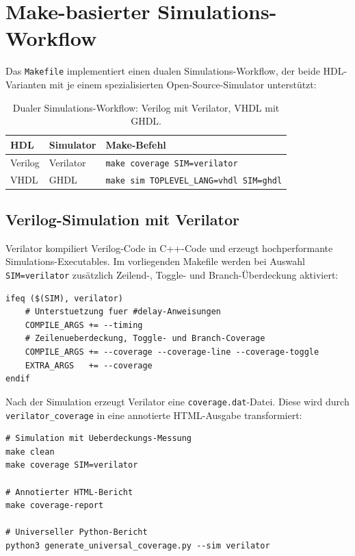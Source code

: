 ﻿\documentclass[12pt,a4paper]{report}
\begin{document}
\section{Make-basierter Simulations-Workflow}
\label{subsec:make_workflow}

Das \texttt{Makefile} implementiert einen dualen Simulations-Workflow, der beide
HDL-Varianten mit je einem spezialisierten Open-Source-Simulator unterstützt:

\begin{table}[H]
\centering
\begin{tabular}{|l|l|l|}
\hline
\textbf{HDL} & \textbf{Simulator} & \textbf{Make-Befehl} \\
\hline
Verilog & Verilator & \texttt{make coverage SIM=verilator} \\
VHDL    & GHDL      & \texttt{make sim TOPLEVEL\_LANG=vhdl SIM=ghdl} \\
\hline
\end{tabular}
\caption{Dualer Simulations-Workflow: Verilog mit Verilator, VHDL mit GHDL.}
\label{tab:sim_workflow}
\end{table}

\subsection{Verilog-Simulation mit Verilator}

Verilator kompiliert Verilog-Code in C++-Code und erzeugt hochperformante
Simulations-Executables. Im vorliegenden Makefile werden bei Auswahl
\texttt{SIM=verilator} zusätzlich Zeilend-, Toggle- und Branch-Überdeckung
aktiviert:

\begin{lstlisting}[style=bashstyle, caption={Verilator-spezifische Makefile-Konfiguration}]
ifeq ($(SIM), verilator)
    # Unterstuetzung fuer #delay-Anweisungen
    COMPILE_ARGS += --timing
    # Zeilenueberdeckung, Toggle- und Branch-Coverage
    COMPILE_ARGS += --coverage --coverage-line --coverage-toggle
    EXTRA_ARGS   += --coverage
endif
\end{lstlisting}

Nach der Simulation erzeugt Verilator eine \texttt{coverage.dat}-Datei.
Diese wird durch \texttt{verilator\_coverage} in eine annotierte
HTML-Ausgabe transformiert:

\begin{lstlisting}[style=bashstyle, caption={Überdeckungsbericht mit Verilator}]
# Simulation mit Ueberdeckungs-Messung
make clean
make coverage SIM=verilator

# Annotierter HTML-Bericht
make coverage-report

# Universeller Python-Bericht
python3 generate_universal_coverage.py --sim verilator
\end{lstlisting}
\end{document}
